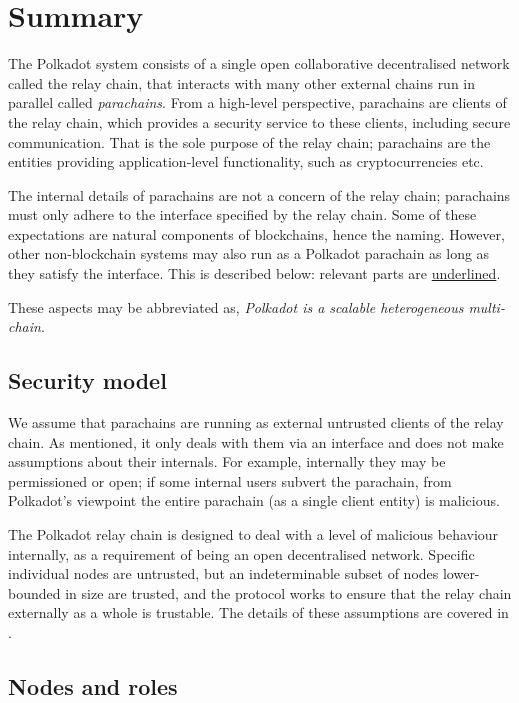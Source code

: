 \section{Summary}\label{sec:summary}


The Polkadot system consists of a single open collaborative decentralised network called the relay chain, that interacts with many other external chains run in parallel called \emph{parachains}. From a high-level perspective, parachains are clients of the relay chain, which provides a security service to these clients, including secure communication. That is the sole purpose of the relay chain; parachains are the entities providing application-level functionality, such as cryptocurrencies etc.

The internal details of parachains are not a concern of the relay chain; parachains must only adhere to the interface specified by the relay chain. Some of these expectations are natural components of blockchains, hence the naming. However, other non-blockchain systems may also run as a Polkadot parachain as long as they satisfy the interface. This is described below: relevant parts are \uline{underlined}.

These aspects may be abbreviated as, \emph{Polkadot is a scalable heterogeneous multi-chain}.

\subsection{Security model}

We assume that parachains are running as external untrusted clients of the relay chain. As mentioned, it only deals with them via an interface and does not make assumptions about their internals. For example, internally they may be permissioned or open; if some internal users subvert the parachain, from Polkadot's viewpoint the entire parachain (as a single client entity) is malicious.

The Polkadot relay chain is designed to deal with a level of malicious behaviour internally, as a requirement of being an open decentralised network. Specific individual nodes are untrusted, but an indeterminable subset of nodes lower-bounded in size are trusted, and the protocol works to ensure that the relay chain externally as a whole is trustable. The details of these assumptions are covered in .

\subsection{Nodes and roles}

